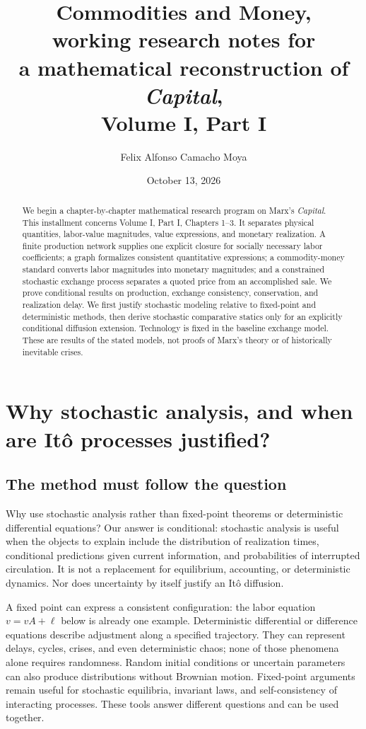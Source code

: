 \documentclass[11pt,letterpaper]{article}
\title{Commodities and Money, \\ working research notes for\\a mathematical reconstruction of \\ \emph{Capital},\\Volume I, Part I}
\author{Felix Alfonso Camacho Moya}
\date{October 13, 2026}
\begin{document}
\maketitle
\begin{abstract}
We begin a chapter-by-chapter mathematical research program on Marx's
\emph{Capital}. This installment concerns Volume I, Part I, Chapters 1--3.
It separates physical quantities, labor-value magnitudes, value expressions,
and monetary realization. A finite production network supplies one explicit
closure for socially necessary labor coefficients; a graph formalizes
consistent quantitative expressions; a commodity-money standard converts
labor magnitudes into monetary magnitudes; and a constrained stochastic
exchange process separates a quoted price from an accomplished sale.
We prove conditional results on production, exchange consistency,
conservation, and realization delay. We first justify stochastic modeling
relative to fixed-point and deterministic methods, then derive stochastic
comparative statics only for an explicitly conditional diffusion extension.
Technology is fixed in the baseline exchange model. These are results of
the stated models, not proofs of Marx's
theory or of historically inevitable crises.
\end{abstract}
\tableofcontents

\section{Why stochastic analysis, and when are It\^o processes justified?}
\label{sec:method}
\subsection{The method must follow the question}
Why use stochastic analysis rather than fixed-point theorems or
deterministic differential equations? Our answer is conditional:
stochastic analysis is useful when the objects to explain include the
distribution of realization times, conditional predictions given current
information, and probabilities of interrupted circulation. It is not a
replacement for equilibrium, accounting, or deterministic dynamics.
Nor does uncertainty by itself justify an It\^o diffusion.

A fixed point can express a consistent configuration: the labor equation
$v=vA+\ell$ below is already one example. Deterministic differential or
difference equations describe adjustment along a specified trajectory.
They can represent delays, cycles, crises, and even deterministic chaos;
none of those phenomena alone requires randomness. Random initial
conditions or uncertain parameters can also produce distributions without
Brownian motion. Fixed-point arguments remain useful for stochastic
equilibria, invariant laws, and self-consistency of interacting processes.
These tools answer different questions and can be used together.
\end{document}
